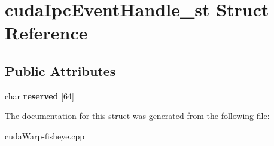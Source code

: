 \hypertarget{structcudaIpcEventHandle__st}{}\section{cuda\+Ipc\+Event\+Handle\+\_\+st Struct Reference}
\label{structcudaIpcEventHandle__st}
\subsection*{Public Attributes}
\begin{DoxyCompactItemize}
\item 
char {\bfseries reserved} \mbox{[}64\mbox{]}\hypertarget{structcudaIpcEventHandle__st_a270103014aac51dcf212e771c47efda6}{}\label{structcudaIpcEventHandle__st_a270103014aac51dcf212e771c47efda6}

\end{DoxyCompactItemize}


The documentation for this struct was generated from the following file\+:\begin{DoxyCompactItemize}
\item 
cuda\+Warp-\/fisheye.\+cpp\end{DoxyCompactItemize}
